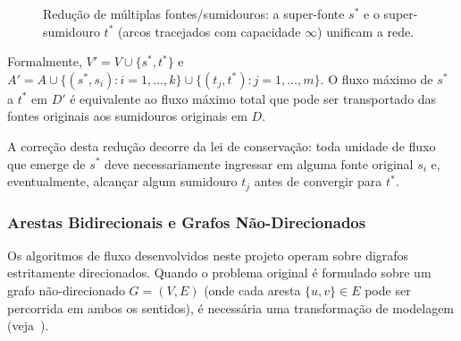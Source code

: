 \documentclass[12pt,a4paper]{article}
\begin{document}
\begin{figure}[h]
\centering
{}
\caption{Redução de múltiplas fontes/sumidouros: a super-fonte $s^*$ e o super-sumidouro $t^*$ (arcos tracejados com capacidade $\infty$) unificam a rede.}
\label{fig:multi_source_sink}
\end{figure}

Formalmente, $V' = V \cup \{s^*, t^*\}$ e $A' = A \cup \{(s^*, s_i) : i = 1,\ldots,k\} \cup \{(t_j, t^*) : j = 1,\ldots,m\}$. O fluxo máximo de $s^*$ a $t^*$ em $D'$ é equivalente ao fluxo máximo total que pode ser transportado das fontes originais aos sumidouros originais em $D$.

A correção desta redução decorre da lei de conservação: toda unidade de fluxo que emerge de $s^*$ deve necessariamente ingressar em alguma fonte original $s_i$ e, eventualmente, alcançar algum sumidouro $t_j$ antes de convergir para $t^*$.

\subsubsection{Arestas Bidirecionais e Grafos Não-Direcionados}

Os algoritmos de fluxo desenvolvidos neste projeto operam sobre digrafos estritamente direcionados. Quando o problema original é formulado sobre um grafo não-direcionado $G = (V, E)$ (onde cada aresta $\{u,v\} \in E$ pode ser percorrida em ambos os sentidos), é necessária uma transformação de modelagem (veja~\cite{ahuja1993network}).
\end{document}
